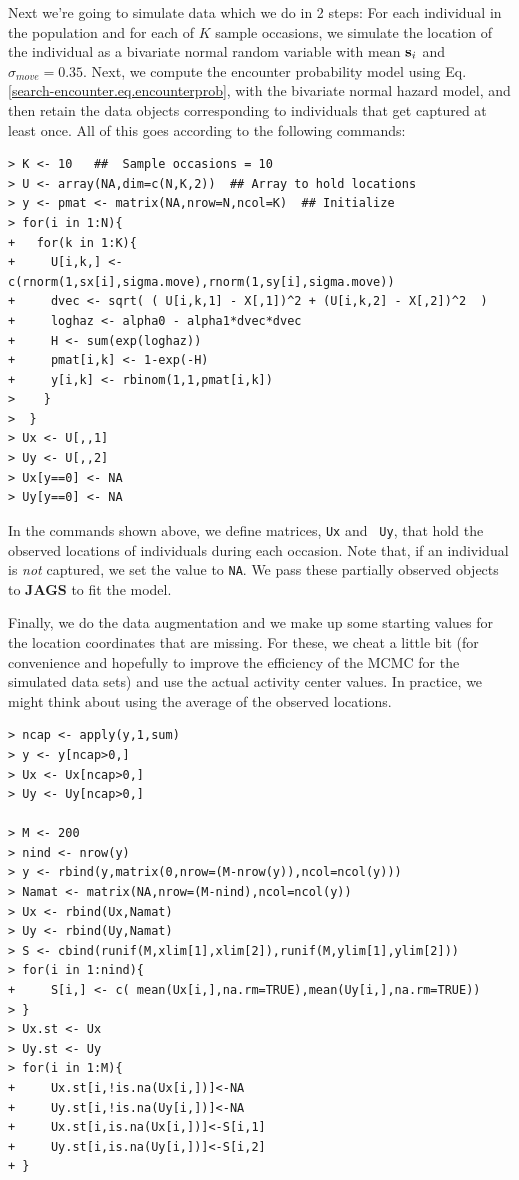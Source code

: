 Next we're going to simulate data which we do in 2 steps:
For each individual in the population and for each of $K$ sample
occasions, we simulate the location of the individual as a bivariate
normal random variable with mean ${\bf s}_i$ and $\sigma_{move} = 0.35$.
 Next, we compute the encounter
probability model using Eq. \ref{search-encounter.eq.encounterprob},
with the bivariate normal hazard model, and then retain the data
objects corresponding to individuals that get captured at least
once. All of this goes according to the following commands:
{\small
\begin{verbatim}
> K <- 10   ##  Sample occasions = 10
> U <- array(NA,dim=c(N,K,2))  ## Array to hold locations
> y <- pmat <- matrix(NA,nrow=N,ncol=K)  ## Initialize
> for(i in 1:N){
+   for(k in 1:K){
+     U[i,k,] <- c(rnorm(1,sx[i],sigma.move),rnorm(1,sy[i],sigma.move))
+     dvec <- sqrt( ( U[i,k,1] - X[,1])^2 + (U[i,k,2] - X[,2])^2  )
+     loghaz <- alpha0 - alpha1*dvec*dvec
+     H <- sum(exp(loghaz))
+     pmat[i,k] <- 1-exp(-H)
+     y[i,k] <- rbinom(1,1,pmat[i,k])
>    }
>  }
> Ux <- U[,,1]
> Uy <- U[,,2]
> Ux[y==0] <- NA
> Uy[y==0] <- NA
\end{verbatim}
}
{\flushleft 
In the} commands shown above, we define matrices, \mbox{\tt Ux} and \mbox{\tt
  Uy}, that hold the observed locations of individuals during each
occasion. Note that, if an individual is {\it not} captured, we set
the value to \mbox{\tt NA}. We pass these partially observed objects
to {\bf JAGS} to fit the model.

Finally, we do the data augmentation and we make up some starting
values for the location coordinates that are missing.
 For these, we
cheat a little bit (for convenience and hopefully to improve the
efficiency of the MCMC for the simulated data sets) and use the actual
activity center values. In practice, we might think about using the
average of the observed locations.
{\small
\begin{verbatim}
> ncap <- apply(y,1,sum)
> y <- y[ncap>0,]
> Ux <- Ux[ncap>0,]
> Uy <- Uy[ncap>0,]

> M <- 200
> nind <- nrow(y)
> y <- rbind(y,matrix(0,nrow=(M-nrow(y)),ncol=ncol(y)))
> Namat <- matrix(NA,nrow=(M-nind),ncol=ncol(y))
> Ux <- rbind(Ux,Namat)
> Uy <- rbind(Uy,Namat)
> S <- cbind(runif(M,xlim[1],xlim[2]),runif(M,ylim[1],ylim[2]))
> for(i in 1:nind){
+     S[i,] <- c( mean(Ux[i,],na.rm=TRUE),mean(Uy[i,],na.rm=TRUE))
> }
> Ux.st <- Ux
> Uy.st <- Uy
> for(i in 1:M){
+     Ux.st[i,!is.na(Ux[i,])]<-NA
+     Uy.st[i,!is.na(Uy[i,])]<-NA
+     Ux.st[i,is.na(Ux[i,])]<-S[i,1]
+     Uy.st[i,is.na(Uy[i,])]<-S[i,2]
+ }
\end{verbatim}
}

